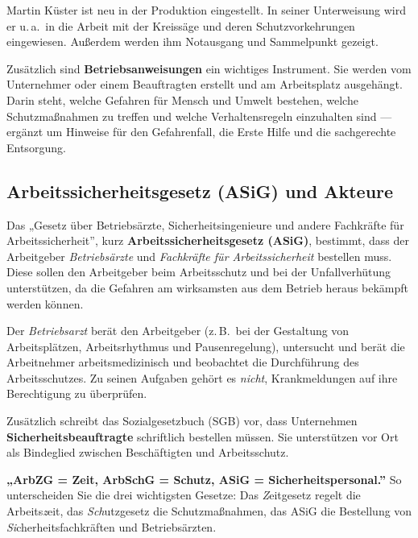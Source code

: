 \documentclass[11pt, a4paper]{article}
\begin{document}
\begin{beispiel}
Martin Küster ist neu in der Produktion eingestellt. In seiner Unterweisung wird er u.\,a.\
in die Arbeit mit der Kreissäge und deren Schutzvorkehrungen eingewiesen. Außerdem werden
ihm Notausgang und Sammelpunkt gezeigt.
\end{beispiel}

Zusätzlich sind \textbf{Betriebsanweisungen} ein wichtiges Instrument. Sie werden vom
Unternehmer oder einem Beauftragten erstellt und am Arbeitsplatz ausgehängt. Darin steht,
welche Gefahren für Mensch und Umwelt bestehen, welche Schutzmaßnahmen zu treffen und
welche Verhaltensregeln einzuhalten sind --- ergänzt um Hinweise für den Gefahrenfall, die
Erste Hilfe und die sachgerechte Entsorgung.

\subsection{Arbeitssicherheitsgesetz (ASiG) und Akteure}

Das „Gesetz über Betriebsärzte, Sicherheitsingenieure und andere Fachkräfte für
Arbeitssicherheit”, kurz \textbf{Arbeitssicherheitsgesetz (ASiG)}, bestimmt, dass der
Arbeitgeber \emph{Betriebsärzte} und \emph{Fachkräfte für Arbeitssicherheit} bestellen muss.
Diese sollen den Arbeitgeber beim Arbeitsschutz und bei der Unfallverhütung unterstützen,
da die Gefahren am wirksamsten aus dem Betrieb heraus bekämpft werden können.

Der \emph{Betriebsarzt} berät den Arbeitgeber (z.\,B.\ bei der Gestaltung von
Arbeitsplätzen, Arbeitsrhythmus und Pausenregelung), untersucht und berät die Arbeitnehmer
arbeitsmedizinisch und beobachtet die Durchführung des Arbeitsschutzes. Zu seinen Aufgaben
gehört es \emph{nicht}, Krankmeldungen auf ihre Berechtigung zu überprüfen.

Zusätzlich schreibt das Sozialgesetzbuch (SGB) vor, dass Unternehmen
\textbf{Sicherheitsbeauftragte} schriftlich bestellen müssen. Sie unterstützen vor Ort als
Bindeglied zwischen Beschäftigten und Arbeitsschutz.

\begin{eselsbruecke}
\textbf{„ArbZG = Zeit, ArbSchG = Schutz, ASiG = Sicherheitspersonal.”} So unterscheiden Sie
die drei wichtigsten Gesetze: Das \emph{Z}eitgesetz regelt die Arbeits\emph{z}eit, das
\emph{Sch}utzgesetz die Schutzmaßnahmen, das ASiG die Bestellung von \emph{Si}cherheits\-fachkräften
und Betriebsärzten.
\end{eselsbruecke}
\end{document}
